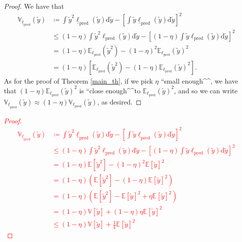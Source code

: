 \documentclass[12pt, english, oneside, a4paper]{article}
\begin{document}
\begin{proof}
    We have that
    \begin{align*}
        \mathbb{V}_{\underline{\ell}_\text{pred}}(\tilde{y}) &\coloneqq \int \tilde{y}^2 \underline{\ell}_\text{pred}(\tilde{y}) \text{d}\tilde{y} - \left[\int \tilde{y} \underline{\ell}_\text{pred}(\tilde{y}) \text{d}\tilde{y}\right]^2\\
        &\leq (1-\eta) \int \tilde{y}^2 {\ell}_\text{pred}(\tilde{y}) \text{d}\tilde{y} - \left[(1-\eta) \int \tilde{y} {\ell}_\text{pred}(\tilde{y}) \text{d}\tilde{y}\right]^2\\
        &= (1-\eta) \mathbb{E}_{\ell_\text{pred}}(\tilde{y}^2) - (1-\eta)^2 \mathbb{E}_{\ell_\text{pred}}(\tilde{y})^2\\
        &= (1-\eta) \left[ \mathbb{E}_{\ell_\text{pred}}(\tilde{y}^2) - (1-\eta) \mathbb{E}_{\ell_\text{pred}}(\tilde{y})^2 \right].
    \end{align*}
    As for the proof of Theorem \ref{main_th}, if we pick $\eta$ ``small enough^\prime^\prime, we have that $(1-\eta) \mathbb{E}_{\ell_\text{pred}}(\tilde{y})^2$ is ``close enough^\prime^\prime to $\mathbb{E}_{\ell_\text{pred}}(\tilde{y})^2$, and so we can write $\mathbb{V}_{\underline{\ell}_\text{pred}}(\tilde{y}) \approx (1-\eta) \mathbb{V}_{{\ell}_\text{pred}}(\tilde{y})$, as desired.
\end{proof}


\textcolor{red}{
\begin{proof}
    \begin{align*}
        \mathbb{V}_{\underline{\ell}_\text{pred}}(\tilde{y}) 
        &\coloneqq \int \tilde{y}^2 \underline{\ell}_\text{pred}(\tilde{y}) \text{d}\tilde{y} - \left[\int \tilde{y} \underline{\ell}_\text{pred}(\tilde{y}) \text{d}\tilde{y}\right]^2\\ 
        &\leq (1-\eta) \int \tilde{y}^2 {\ell}_\text{pred}(\tilde{y}) \text{d}\tilde{y} - \left[(1-\eta) \int \tilde{y} {\ell}_\text{pred}(\tilde{y}) \text{d}\tilde{y}\right]^2 \tag{actually why upper bound?}\\ 
        &= (1-\eta)\mathbb{E}[\tilde{y}^2] - (1-\eta)^2\mathbb{E}[\tilde{y}]^2 \\
        &= (1-\eta)\left(\mathbb{E}[\tilde{y}^2] - (1-\eta)\mathbb{E}[\tilde{y}]^2\right) \\
        &= (1-\eta)\left(\mathbb{E}[\tilde{y}^2] - \mathbb{E}[\tilde{y}]^2 + \eta\mathbb{E}[\tilde{y}]^2\right) \\
        &= (1-\eta)\mathbb{V}[\tilde{y}] + (1-\eta)\eta \mathbb{E}[\tilde{y}]^2\\
        &\leq (1-\eta)\mathbb{V}[\tilde{y}] + \frac{1}{4}\mathbb{E}[\tilde{y}]^2
    \end{align*}
\end{proof}
}
\end{document}
